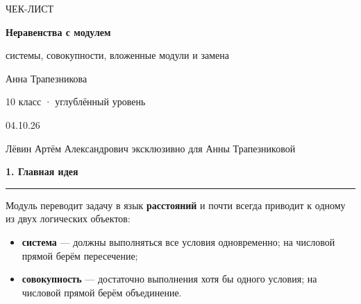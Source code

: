 \documentclass[a4paper,12pt]{article}
\newcommand{\lessonsection}[1]{%
  \vspace{0.5em}
  {\Large\bfseries\color{darkaccent}#1}\par\vspace{0.35em}
  {\color{accent}\rule{\linewidth}{0.6pt}}\vspace{0.6em}
}
\newcommand{\key}[1]{\textbf{\color{darkaccent}#1}}
\begin{document}
\thispagestyle{empty}
\begin{center}
\vspace*{28mm}
{\Large\color{softgray}ЧЕК-ЛИСТ}\par
\vspace{8mm}
{\fontsize{27}{32}\selectfont\bfseries\color{darkaccent}Неравенства с модулем}\par
\vspace{4mm}
{\Large системы, совокупности, вложенные модули и замена}\par
\vspace{18mm}
{\large Анна Трапезникова}\par
\vspace{3mm}
{\normalsize 10 класс · углублённый уровень}\par
\vspace{16mm}
{\large 04.10.26}\par
\vfill
{\normalsize\color{textgray}Лёвин Артём Александрович эксклюзивно для Анны Трапезниковой}\par
\vspace{8mm}
\end{center}

\clearpage

\lessonsection{1. Главная идея}

Модуль переводит задачу в язык \key{расстояний} и почти всегда приводит к одному из двух логических объектов:
\begin{itemize}
  \item \key{система} --- должны выполняться все условия одновременно; на числовой прямой берём пересечение;
  \item \key{совокупность} --- достаточно выполнения хотя бы одного условия; на числовой прямой берём объединение.
\end{itemize}
\end{document}

